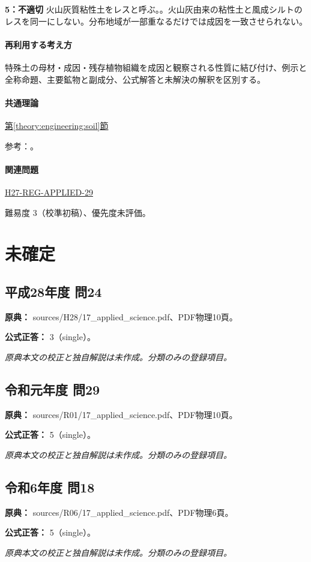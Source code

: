 \noindent\textbf{5：不適切} 火山灰質粘性土をレスと呼ぶ。。火山灰由来の粘性土と風成シルトのレスを同一にしない。分布地域が一部重なるだけでは成因を一致させられない。\par

\paragraph{再利用する考え方} 特殊土の母材・成因・残存植物組織を成因と観察される性質に結び付け、例示と全称命題、主要鉱物と副成分、公式解答と未解決の解釈を区別する。

\paragraph{共通理論} \hyperref[theory:engineering:soil]{第\ref*{theory:engineering:soil}節}

\par 参考：\cite{mlit_masa,maff_shiras2017,mlit_peat,gsj_loess2002}。

\paragraph{関連問題} \hyperref[q:h27-reg-applied-29]{H27-REG-APPLIED-29}

\par 難易度 3（校準初稿）、優先度未評価。

\section{未確定}

\subsection{平成28年度 問24}
\label{q:h28-reg-applied-24}

\noindent\textbf{原典：} sources/H28/17\_applied\_science.pdf、PDF物理10頁。

\textbf{公式正答：} 3（single）。

\par\textit{原典本文の校正と独自解説は未作成。分類のみの登録項目。}

\subsection{令和元年度 問29}
\label{q:r01-reg-applied-29}

\noindent\textbf{原典：} sources/R01/17\_applied\_science.pdf、PDF物理10頁。

\textbf{公式正答：} 5（single）。

\par\textit{原典本文の校正と独自解説は未作成。分類のみの登録項目。}

\subsection{令和6年度 問18}
\label{q:r06-reg-applied-18}

\noindent\textbf{原典：} sources/R06/17\_applied\_science.pdf、PDF物理6頁。

\textbf{公式正答：} 5（single）。

\par\textit{原典本文の校正と独自解説は未作成。分類のみの登録項目。}
